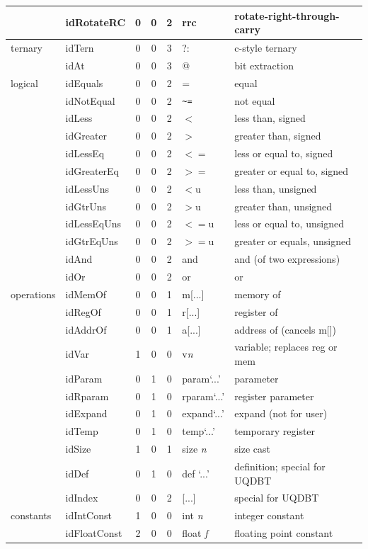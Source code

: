\begin{tabular}{|l|l|c|c|c|l|l|}
            & idRotateRC    &0&0&2  & rrc       & rotate-right-through-carry \\
\hline
ternary     & idTern        &0&0&3  & ?:        & c-style ternary \\
            & idAt          &0&0&3  & @         & bit extraction \\
\hline
logical     & idEquals      &0&0&2  & =         & equal \\
            & idNotEqual    &0&0&2  & \verb!~=! & not equal \\
            & idLess        &0&0&2  & $<$       & less than, signed \\
            & idGreater     &0&0&2  & $>$       & greater than, signed \\
            & idLessEq      &0&0&2  & $<=$      & less or equal to, signed \\
            & idGreaterEq   &0&0&2  & $>=$      & greater or equal to, signed \\
            & idLessUns     &0&0&2  & $<$u      & less than, unsigned \\
            & idGtrUns      &0&0&2  & $>$u      & greater than, unsigned \\
            & idLessEqUns   &0&0&2  & $<=$u     & less or equal to, unsigned \\
            & idGtrEqUns    &0&0&2  & $>=$u     & greater or equals, unsigned \\
            & idAnd         &0&0&2  & and       & and (of two expressions) \\
            & idOr          &0&0&2  & or        & or \\
\hline
operations  & idMemOf       &0&0&1  & m[...]    & memory of \\
            & idRegOf       &0&0&1  & r[...]    & register of \\
            & idAddrOf      &0&0&1  & a[...]    & address of (cancels m[]) \\
            & idVar         &1&0&0  & v\it{n}   & variable; replaces reg or mem \\
            & idParam       &0&1&0  & param`...'& parameter \\
            & idRparam      &0&1&0  & rparam`...'& register parameter \\
            & idExpand      &0&1&0  & expand`...'& expand (not for user) \\
            & idTemp        &0&1&0  & temp`...' & temporary register \\
            & idSize        &1&0&1  & size \it{n}& size cast \\
            & idDef         &0&1&0  & def `...' & definition; special for UQDBT \\
            & idIndex       &0&0&2  & [...]     & special for UQDBT \\
\hline
constants   & idIntConst    &1&0&0  & int \it{n}& integer constant \\
            & idFloatConst  &2&0&0  & float \it{f}& floating point constant \\
\hline
\end{tabular}

